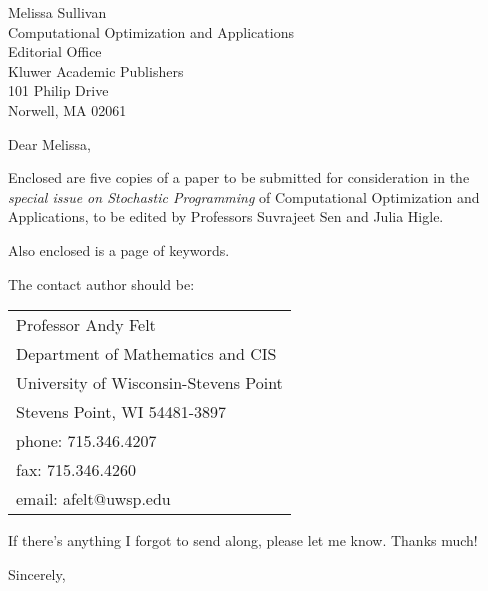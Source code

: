 \documentclass[11pt]{letter}
\begin{document}
\begin{letter}{Melissa Sullivan\\ Computational Optimization and Applications\\ Editorial Office \\ Kluwer Academic Publishers\\ 101 Philip Drive\\ Norwell, MA  02061}

\opening{Dear Melissa,}

Enclosed are five copies of a paper to be submitted for consideration in the \emph{special issue on Stochastic Programming} of Computational Optimization and Applications, to be edited by Professors Suvrajeet Sen and Julia Higle. 

Also enclosed is a page of keywords.

The contact author should be:
\begin{center}
\begin{tabular}{l}
Professor Andy Felt\\
Department of Mathematics and CIS\\
University of Wisconsin-Stevens Point\\
Stevens Point, WI  54481-3897\\
phone: 715.346.4207\\
fax:  715.346.4260\\
email:  afelt@uwsp.edu
\end{tabular}
\end{center}

If there's anything I forgot to send along, please let me know.  Thanks much!

\closing{Sincerely,}
\end{letter}
\end{document}
